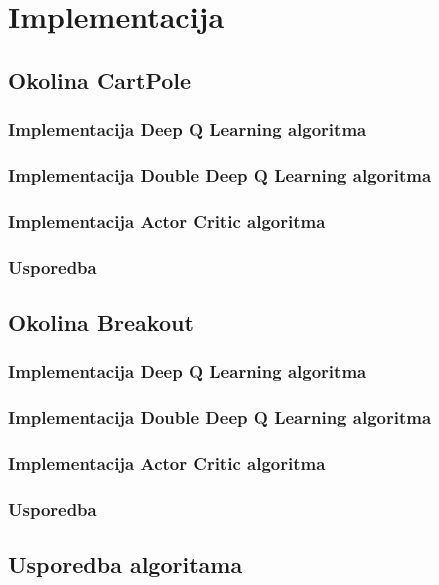 \chapter{Implementacija}

\section{Okolina CartPole}

\subsection{Implementacija Deep Q Learning algoritma}

\subsection{Implementacija Double Deep Q Learning algoritma}

\subsection{Implementacija Actor Critic algoritma}

\subsection{Usporedba}

\section{Okolina Breakout}

\subsection{Implementacija Deep Q Learning algoritma}

\subsection{Implementacija Double Deep Q Learning algoritma}

\subsection{Implementacija Actor Critic algoritma}

\subsection{Usporedba}

\section{Usporedba algoritama}

